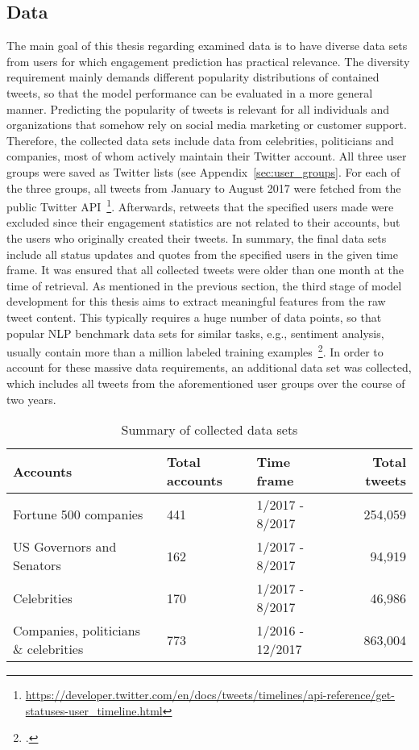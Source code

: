 \subsection{Data}
\label{sec:data_collection}

The main goal of this thesis regarding examined data is to have diverse
data sets from users for which engagement prediction has practical relevance.
The diversity requirement mainly demands different popularity distributions of contained tweets,
so that the model performance can be evaluated in a more general manner.
Predicting the popularity of tweets is relevant for all individuals and
organizations that somehow rely on social media marketing or customer support.
Therefore, the collected data sets include data from celebrities, politicians and
companies, most of whom actively maintain their Twitter account.
All three user groups were saved as Twitter lists (see Appendix~\ref{sec:user_groups}.
For each of the three groups, all tweets from January to August 2017 were
fetched from the public Twitter API~\footnote{\url{https://developer.twitter.com/en/docs/tweets/timelines/api-reference/get-statuses-user_timeline.html}}.
Afterwards, retweets that the specified users made were excluded since their
engagement statistics are not related to their accounts, but the users who
originally created their tweets.
In summary, the final data sets include all status updates and quotes from the
specified users in the given time frame.
It was ensured that all collected tweets were older than one month 
at the time of retrieval.
As mentioned in the previous section, the third stage of model development
for this thesis aims to extract meaningful features from the raw tweet content.
This typically requires a huge number of data points, so that popular NLP benchmark
data sets for similar tasks, e.g., sentiment analysis, usually contain more than
a million labeled training examples~\footcite{Go2009}.
In order to account for these massive data requirements, an additional data set was
collected, which includes all tweets from the aforementioned user groups over
the course of two years.

\begin{table}
\begin{tabular}{lllr}
\toprule
  Accounts & Total accounts & Time frame & Total tweets \\
\midrule
  Fortune 500 companies & 441 & 1/2017 - 8/2017 & 254,059 \\
  US Governors and Senators & 162 & 1/2017 -  8/2017 & 94,919 \\
  Celebrities & 170 & 1/2017 - 8/2017 & 46,986 \\
  Companies, politicians \& celebrities & 773 & 1/2016 - 12/2017 & 863,004 \\
\bottomrule
\end{tabular}
\caption{Summary of collected data sets}
\label{tab:dataset_summary}
\end{table}

